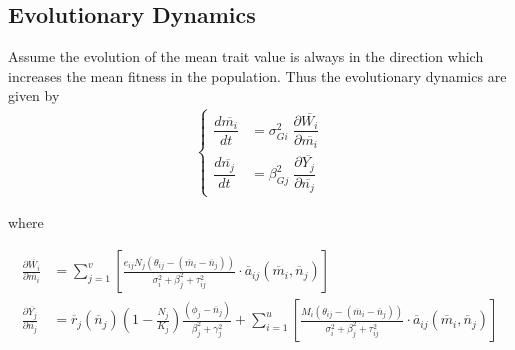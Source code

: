 \documentclass[12pt]{article}
\begin{document}
\subsection*{Evolutionary Dynamics}
\noindent Assume the evolution of the mean trait value is always in the direction which increases the mean fitness in the population.  Thus the evolutionary dynamics are given by
\begin{align}
	\begin{cases}
		\dfrac{d\overline{m_i}}{dt} &= \sigma_{Gi}^2 \; \dfrac{\partial \overline{W_i}}{\partial \overline{m_i}} \\[.25cm]
		\dfrac{d\overline{n_j}}{dt} &= \beta_{Gj}^2 \; \dfrac{\partial \overline{Y_j}}{\partial \overline{n_j}}
	\end{cases}
\end{align}

\noindent where

\begin{align*}
	\frac{\partial \overline{W_i}}{\partial \overline{m_i}} &= \sum_{j=1}^v\left[\frac{e_{ij}N_j(\theta_{ij} - (\overline{m}_i - \overline{n}_j))}{\sigma_i^2 + \beta_j^2 + \tau_{ij}^2} \cdot \overline{a}_{ij}(\overline{m}_i, \overline{n}_j)\right]\\
	\frac{\partial \overline{Y_j}}{\partial \overline{n_j}} &= \overline{r}_j(\overline{n}_j)\left(1 - \frac{N_j}{K_j}\right)\frac{(\phi_j - \overline{n}_j)}{\beta_j^2 + \gamma_j^2} + \sum_{i=1}^u\left[\frac{M_i(\theta_{ij} - (\overline{m}_i - \overline{n}_j))}{\sigma_i^2 + \beta_j^2 + \tau_{ij}^2} \cdot \overline{a}_{ij}(\overline{m}_i, \overline{n}_j)\right]
\end{align*}
\end{document}
